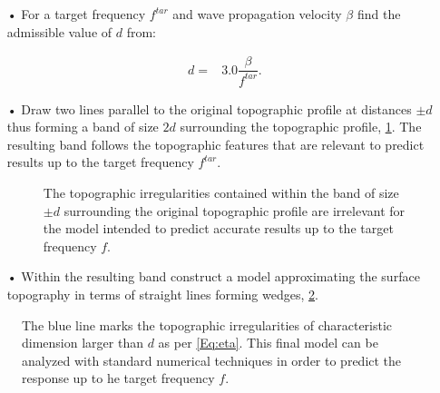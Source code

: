\documentclass[11pt,letterpaper]{article}
\begin{document}
\begin{itemize}
\item[•] For a target frequency $f^{tar}$ and wave propagation velocity $\beta$ find the admissible value of $d$ from:

\begin{equation}
\begin{split}
d = & 3.0  \dfrac{\beta}{f^{tar}} .
\label{Eq:eta}
\end{split}
\end{equation}



\item[•] Draw two lines parallel to the original topographic profile at distances $\pm d$ thus forming a band of size $2d$ surrounding the topographic profile, \cref{fig:aplicageneral}. The resulting band follows the topographic features that are relevant to predict results up to the target frequency $f^{tar}$.


\begin{figure}[H]
	\centering
	\caption{\small The topographic irregularities contained within the band of size $\pm d$ surrounding the original topographic profile are irrelevant for the model intended to predict accurate results up to the target frequency $f$.}
	\label{fig:aplicageneral}
\end{figure}


\item[•] Within the resulting band construct a model approximating the surface topography in terms of straight lines forming wedges, \cref{fig:wedges}. 
\end{itemize}


\begin{figure}[H]
	\centering
	\caption{\small The blue line marks the topographic irregularities of characteristic dimension larger than $d$ as per \cref{Eq:eta}. This final model can be analyzed with standard numerical techniques in order to predict the response up to he target frequency $f$.}
	\label{fig:wedges}
\end{figure}
\end{document}
